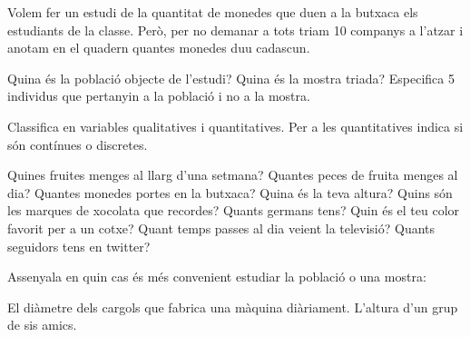 \begin{mylist}

\exer Volem fer un estudi de la quantitat de monedes que duen a la butxaca els estudiants de la classe. Però, per no demanar a tots triam 10 companys a l'atzar i anotam en el quadern quantes monedes duu cadascun.

\begin{tasks}
	\task Quina és la població objecte de l'estudi?
	\task Quina és la mostra triada?
	\task Especifica 5 individus que pertanyin a la població i no a la mostra.
\end{tasks}
 
 
\exer \spen Classifica en variables qualitatives i quantitatives. Per a les quantitatives indica si són contínues o discretes.
\begin{tasks}
\task Quines fruites menges al llarg d'una setmana? \dotfill\hspace{1cm}
\task  Quantes peces de fruita menges al dia? \dotfill\hspace{1cm}
\task  Quantes monedes portes en la butxaca? \dotfill\hspace{1cm}
\task  Quina és la teva altura? \dotfill\hspace{1cm}
\task  Quins són les marques de xocolata que recordes? \dotfill\hspace{1cm}
\task  Quants germans tens? \dotfill\hspace{1cm}
\task  Quin és el teu color favorit per a un cotxe? \dotfill\hspace{1cm}
\task  Quant temps passes al dia veient la televisió? \dotfill\hspace{1cm}
\task  Quants seguidors tens en twitter? \dotfill\hspace{1cm}
\end{tasks}
 

 \exer Assenyala en quin cas és més convenient estudiar la població o una mostra:
\begin{tasks}
 \task El diàmetre dels cargols que fabrica una màquina diàriament. 
%
 \task L'altura d'un grup de sis amics. 
\end{tasks}
 


\end{mylist}
